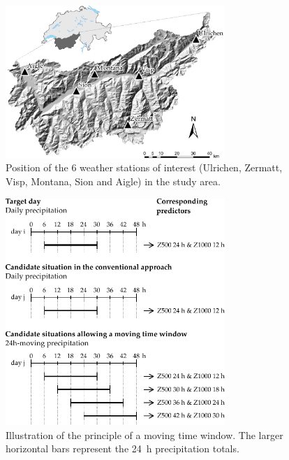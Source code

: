 \documentclass[hess, manuscript]{copernicus}
\begin{document}
\begin{figure}[htb]
	\begin{center}
		\includegraphics[width=8.3cm]{figures/figure_map.pdf}
	\end{center}
	\caption{Position of the 6 weather stations of interest (Ulrichen, Zermatt, Visp, Montana, Sion and Aigle) in the study area.}
	\label{fig:map}
\end{figure}

\begin{figure}[htb]
	\begin{center}
		\includegraphics[width=8.3cm]{figures/illustration_moving_window.pdf}
	\end{center}
	\caption{Illustration of the principle of a moving time window. The larger horizontal bars represent the 24~h precipitation totals.}
	\label{fig:principle}
\end{figure}
\end{document}
